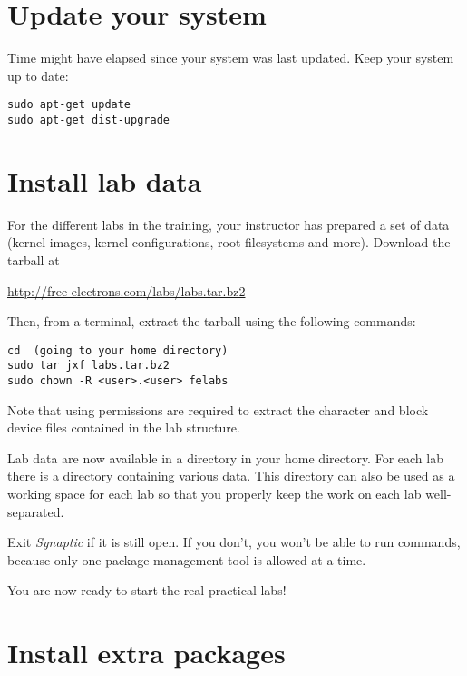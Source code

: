 
\section{Update your system}

Time might have elapsed since your system was last updated. Keep your
system up to date:

\begin{verbatim}
sudo apt-get update
sudo apt-get dist-upgrade
\end{verbatim}

\section{Install lab data}

For the different labs in the training, your instructor has prepared a
set of data (kernel images, kernel configurations, root filesystems
and more). Download the tarball at

\url{http://free-electrons.com/labs/labs.tar.bz2}

Then, from a terminal, extract the tarball using the following
commands:

\begin{verbatim}
cd	(going to your home directory)
sudo tar jxf labs.tar.bz2
sudo chown -R <user>.<user> felabs
\end{verbatim}

Note that using  permissions are required to extract the
character and block device files contained in the lab structure.

Lab data are now available in a  directory in your home
directory. For each lab there is a directory containing various
data. This directory can also be used as a working space for each lab
so that you properly keep the work on each lab well-separated.

Exit {\em Synaptic} if it is still open. If you don't, you won't be
able to run  commands, because only one package
management tool is allowed at a time.

You are now ready to start the real practical labs!

\section{Install extra packages}

